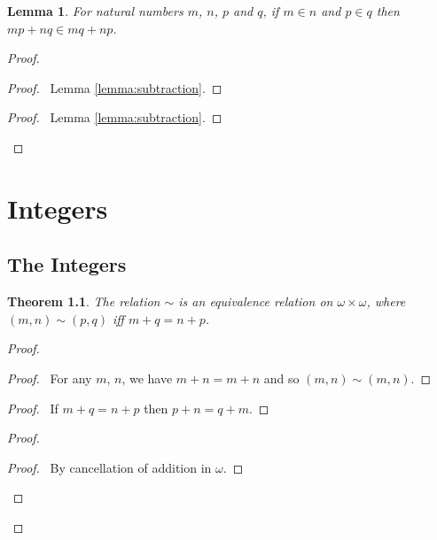 \documentclass{report}
\let\qed\relax
\newtheorem{lemma}[axiom]{Lemma}
\newtheorem{theorem}[axiom]{Theorem}
\theoremstyle{definition}
\begin{document}
    \begin{lemma}
        \label{lemma:pre_integer_ordering}
        For natural numbers $m$, $n$, $p$ and $q$, if $m \in n$ and $p \in q$
        then $mp + nq \in mq + np$.
    \end{lemma}

    \begin{proof}
        \begin{proof}
            \pf\ Lemma \ref{lemma:subtraction}.
        \end{proof}
        \begin{proof}
            \pf\ Lemma \ref{lemma:subtraction}.
        \end{proof}
    \end{proof}

    \chapter{Integers}

    \section{The Integers}

    \begin{theorem}
        The relation $\sim$ is an equivalence relation on $\omega \times \omega$, where $(m,n) \sim (p,q)$ iff
        $m + q = n + p$.
    \end{theorem}

    \begin{proof}
        \pf
        \begin{proof}
            \pf\ For any $m$, $n$, we have $m + n = m + n$ and so $(m,n) \sim (m,n)$.
        \end{proof}
        \begin{proof}
            \pf\ If $m + q = n + p$ then $p + n = q + m$.
        \end{proof}
        \begin{proof}
            \begin{proof}
                \pf\ By cancellation of addition in $\omega$.
            \end{proof}
        \end{proof}
        \qed
    \end{proof}
\end{document}
